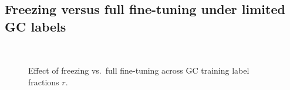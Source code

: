 \documentclass[diagnostics,article,submit,pdftex,moreauthors]{Definitions/mdpi}
\begin{document}


\subsection{Freezing versus full fine-tuning under limited GC labels}
\begin{figure}[htbp]
	\centering
	\\
	\caption{Effect of freezing vs.\ full fine-tuning across GC training label fractions $r$.\label{fig:transfer-combo-gcrate}}
\end{figure}
\end{document}
